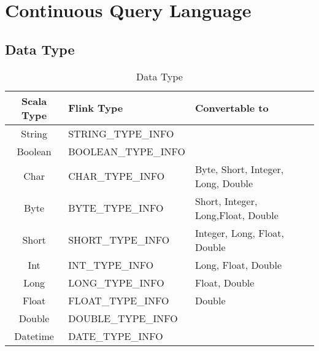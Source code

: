 \section{Continuous Query Language}


\subsection{Data Type}


\begin{table}[h]
\caption{Data Type}
\centering
\label{table:nice_table}
\setlength\extrarowheight{5pt}
\begin{tabular}{||c|l|l||}
\hline
\textbf{Scala Type} &  \textbf{Flink Type} & \textbf{Convertable to} \\ \hline\hline
                    String               &           STRING\_TYPE\_INFO                   &  \\ \hline
                    Boolean				&           BOOLEAN\_TYPE\_INFO                  &   \\ \hline
                   Char					&           CHAR\_TYPE\_INFO                       &  Byte, Short, Integer, Long, Double\\ \hline
					Byte		           	&           BYTE\_TYPE\_INFO                     & Short, Integer, Long,Float, Double \\ \hline
					Short				&           SHORT\_TYPE\_INFO                    & Integer, Long, Float, Double\\ \hline								
					Int					&           INT\_TYPE\_INFO                      & Long, Float, Double\\ \hline
					Long			 		&           LONG\_TYPE\_INFO                     & Float, Double \\ \hline								
					Float				&           FLOAT\_TYPE\_INFO                    & Double \\ \hline
					Double				&           DOUBLE\_TYPE\_INFO                   &   \\ \hline							
	Datetime				&           DATE\_TYPE\_INFO                &        	\\ \hline           							           							           							           							           
\end{tabular}
\end{table}



